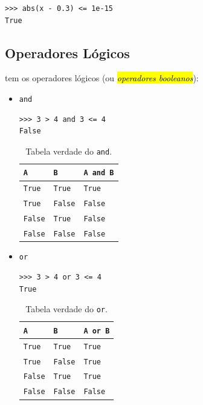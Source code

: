 \begin{lstlisting}
>>> abs(x - 0.3) <= 1e-15
True
\end{lstlisting}

\subsection{Operadores Lógicos}

{\python} tem os operadores lógicos (ou \hl{\emph{operadores booleanos}}):
\begin{itemize}
\item \lstinline+and+ 

\begin{lstlisting}[framexrightmargin=-2.5em]
>>> 3 > 4 and 3 <= 4
False
\end{lstlisting}

  \begin{table}[H]
    \centering
    \caption{Tabela verdade do \lstinline+and+.}
    \begin{tabular}{ll|l}
      {\lstinline+A+} & {\lstinline+B+} & {\lstinline+A and B+}\\\hline
      {\lstinline+True+} & {\lstinline+True+} & {\lstinline+True+}\\
      {\lstinline+True+} & {\lstinline+False+} & {\lstinline+False+}\\
      {\lstinline+False+} & {\lstinline+True+} & {\lstinline+False+}\\
      {\lstinline+False+} & {\lstinline+False+} & {\lstinline+False+}\\\hline
    \end{tabular}
  \end{table}

\item \lstinline+or+ 

\begin{lstlisting}[framexrightmargin=-2.5em]
>>> 3 > 4 or 3 <= 4
True
\end{lstlisting}

  \begin{table}[H]
    \centering
    \caption{Tabela verdade do \lstinline+or+.}
    \begin{tabular}{ll|l}
      {\lstinline+A+}     & {\lstinline+B+}     & {\lstinline+A or B+} \\\hline
      {\lstinline+True+}  & {\lstinline+True+}  & {\lstinline+True+} \\
      {\lstinline+True+}  & {\lstinline+False+} & {\lstinline+True+} \\
      {\lstinline+False+} & {\lstinline+True+ } & {\lstinline+True+} \\
      {\lstinline+False+} & {\lstinline+False+} & {\lstinline+False+} \\\hline
    \end{tabular}
  \end{table}


\end{itemize}

